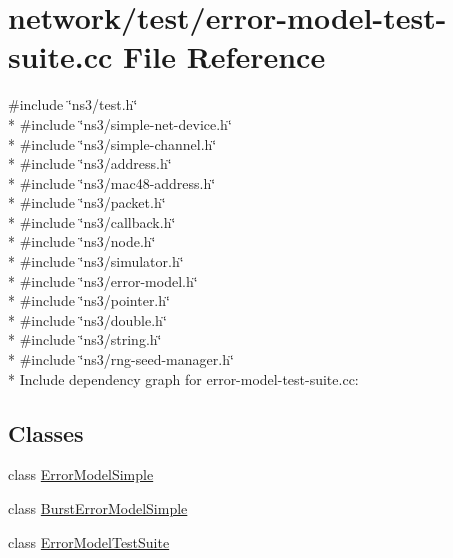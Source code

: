 \hypertarget{error-model-test-suite_8cc}{}\section{network/test/error-\/model-\/test-\/suite.cc File Reference}
\label{error-model-test-suite_8cc}
{\ttfamily \#include \char`\"{}ns3/test.\+h\char`\"{}}\\*
{\ttfamily \#include \char`\"{}ns3/simple-\/net-\/device.\+h\char`\"{}}\\*
{\ttfamily \#include \char`\"{}ns3/simple-\/channel.\+h\char`\"{}}\\*
{\ttfamily \#include \char`\"{}ns3/address.\+h\char`\"{}}\\*
{\ttfamily \#include \char`\"{}ns3/mac48-\/address.\+h\char`\"{}}\\*
{\ttfamily \#include \char`\"{}ns3/packet.\+h\char`\"{}}\\*
{\ttfamily \#include \char`\"{}ns3/callback.\+h\char`\"{}}\\*
{\ttfamily \#include \char`\"{}ns3/node.\+h\char`\"{}}\\*
{\ttfamily \#include \char`\"{}ns3/simulator.\+h\char`\"{}}\\*
{\ttfamily \#include \char`\"{}ns3/error-\/model.\+h\char`\"{}}\\*
{\ttfamily \#include \char`\"{}ns3/pointer.\+h\char`\"{}}\\*
{\ttfamily \#include \char`\"{}ns3/double.\+h\char`\"{}}\\*
{\ttfamily \#include \char`\"{}ns3/string.\+h\char`\"{}}\\*
{\ttfamily \#include \char`\"{}ns3/rng-\/seed-\/manager.\+h\char`\"{}}\\*
Include dependency graph for error-\/model-\/test-\/suite.cc\+:
\subsection*{Classes}
\begin{DoxyCompactItemize}
\item 
class \hyperlink{classErrorModelSimple}{Error\+Model\+Simple}
\item 
class \hyperlink{classBurstErrorModelSimple}{Burst\+Error\+Model\+Simple}
\item 
class \hyperlink{classErrorModelTestSuite}{Error\+Model\+Test\+Suite}
\end{DoxyCompactItemize}
